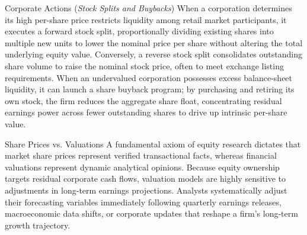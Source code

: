 \documentclass[10pt]{article}
\begin{document}
    \begin{core}{Corporate Actions (\textit{Stock Splits and Buybacks})}
      When a corporation determines its high per-share price restricts liquidity among retail market participants, it executes a forward stock split, proportionally dividing existing shares into multiple new units to lower the nominal price per share without altering the total underlying equity value. Conversely, a reverse stock split consolidates outstanding share volume to raise the nominal stock price, often to meet exchange listing requirements. When an undervalued corporation possesses excess balance-sheet liquidity, it can launch a share buyback program; by purchasing and retiring its own stock, the firm reduces the aggregate share float, concentrating residual earnings power across fewer outstanding shares to drive up intrinsic per-share value.
    \end{core}

    \begin{core}{Share Prices vs. Valuations}
      A fundamental axiom of equity research dictates that market share prices represent verified transactional facts, whereas financial valuations represent dynamic analytical opinions. Because equity ownership targets residual corporate cash flows, valuation models are highly sensitive to adjustments in long-term earnings projections. Analysts systematically adjust their forecasting variables immediately following quarterly earnings releases, macroeconomic data shifts, or corporate updates that reshape a firm's long-term growth trajectory.
    \end{core}
\end{document}
